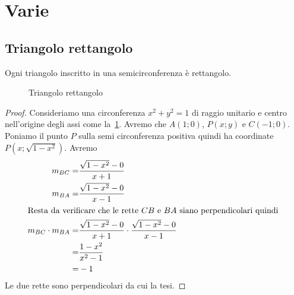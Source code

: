 \section{Varie}
\subsection{Triangolo rettangolo}
\begin{thm}\label{thm:TriangoloRettangoloSemicirconferenza}
Ogni triangolo inscritto in una semicirconferenza è rettangolo.
\end{thm}
\begin{figure}
	\centering
	
	\caption{Triangolo rettangolo}
	\label{fig:triangolorettangoloinscritto}
\end{figure}
\begin{proof}
Consideriamo una circonferenza $x^2+y^2=1$ di raggio unitario e centro nell'origine degli assi come la~\cref{fig:triangolorettangoloinscritto}. Avremo che $A(1;0)$, $P(x;y)$ e $C(-1;0)$. Poniamo il punto $P$ sulla semi circonferenza positiva quindi ha coordinate $P(x;\sqrt{1-x^2})$. Avremo
\begin{align*}
m_{BC}=&\dfrac{\sqrt{1-x^2}-0}{x+1}\\
m_{BA}=&\dfrac{\sqrt{1-x^2}-0}{x-1}\\
\intertext{Resta da verificare che le rette $CB$ e $BA$ siano perpendicolari quindi }
m_{BC}\cdot m_{BA}=&\dfrac{\sqrt{1-x^2}-0}{x+1}\cdot\dfrac{\sqrt{1-x^2}-0}{x-1}\\
=&\dfrac{1-x^2}{x^2-1}\\
=&-1
\end{align*}
Le due rette sono perpendicolari da cui la tesi.
\end{proof}